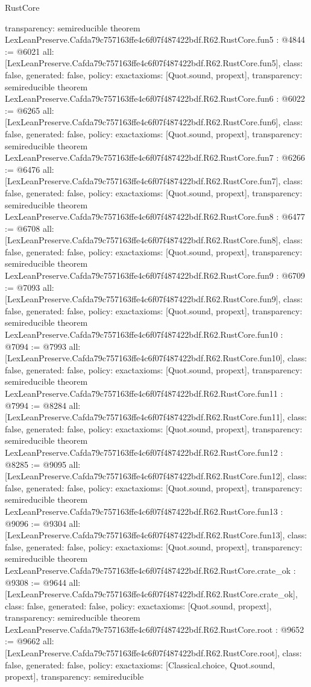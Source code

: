 \begin{lexlean}{RustCore}
\begin{coremodule}
{  transparency: semireducible
}
theorem LexLeanPreserve.Cafda79c757163ffe4c6f07f487422bdf.R62.RustCore.fun5 : @4844 := @6021 {
  all: [LexLeanPreserve.Cafda79c757163ffe4c6f07f487422bdf.R62.RustCore.fun5],
  class: false,
  generated: false,
  policy: exact{axioms: [Quot.sound, propext]},
  transparency: semireducible
}
theorem LexLeanPreserve.Cafda79c757163ffe4c6f07f487422bdf.R62.RustCore.fun6 : @6022 := @6265 {
  all: [LexLeanPreserve.Cafda79c757163ffe4c6f07f487422bdf.R62.RustCore.fun6],
  class: false,
  generated: false,
  policy: exact{axioms: [Quot.sound, propext]},
  transparency: semireducible
}
theorem LexLeanPreserve.Cafda79c757163ffe4c6f07f487422bdf.R62.RustCore.fun7 : @6266 := @6476 {
  all: [LexLeanPreserve.Cafda79c757163ffe4c6f07f487422bdf.R62.RustCore.fun7],
  class: false,
  generated: false,
  policy: exact{axioms: [Quot.sound, propext]},
  transparency: semireducible
}
theorem LexLeanPreserve.Cafda79c757163ffe4c6f07f487422bdf.R62.RustCore.fun8 : @6477 := @6708 {
  all: [LexLeanPreserve.Cafda79c757163ffe4c6f07f487422bdf.R62.RustCore.fun8],
  class: false,
  generated: false,
  policy: exact{axioms: [Quot.sound, propext]},
  transparency: semireducible
}
theorem LexLeanPreserve.Cafda79c757163ffe4c6f07f487422bdf.R62.RustCore.fun9 : @6709 := @7093 {
  all: [LexLeanPreserve.Cafda79c757163ffe4c6f07f487422bdf.R62.RustCore.fun9],
  class: false,
  generated: false,
  policy: exact{axioms: [Quot.sound, propext]},
  transparency: semireducible
}
theorem LexLeanPreserve.Cafda79c757163ffe4c6f07f487422bdf.R62.RustCore.fun10 : @7094 := @7993 {
  all: [LexLeanPreserve.Cafda79c757163ffe4c6f07f487422bdf.R62.RustCore.fun10],
  class: false,
  generated: false,
  policy: exact{axioms: [Quot.sound, propext]},
  transparency: semireducible
}
theorem LexLeanPreserve.Cafda79c757163ffe4c6f07f487422bdf.R62.RustCore.fun11 : @7994 := @8284 {
  all: [LexLeanPreserve.Cafda79c757163ffe4c6f07f487422bdf.R62.RustCore.fun11],
  class: false,
  generated: false,
  policy: exact{axioms: [Quot.sound, propext]},
  transparency: semireducible
}
theorem LexLeanPreserve.Cafda79c757163ffe4c6f07f487422bdf.R62.RustCore.fun12 : @8285 := @9095 {
  all: [LexLeanPreserve.Cafda79c757163ffe4c6f07f487422bdf.R62.RustCore.fun12],
  class: false,
  generated: false,
  policy: exact{axioms: [Quot.sound, propext]},
  transparency: semireducible
}
theorem LexLeanPreserve.Cafda79c757163ffe4c6f07f487422bdf.R62.RustCore.fun13 : @9096 := @9304 {
  all: [LexLeanPreserve.Cafda79c757163ffe4c6f07f487422bdf.R62.RustCore.fun13],
  class: false,
  generated: false,
  policy: exact{axioms: [Quot.sound, propext]},
  transparency: semireducible
}
theorem LexLeanPreserve.Cafda79c757163ffe4c6f07f487422bdf.R62.RustCore.crate_ok : @9308 := @9644 {
  all: [LexLeanPreserve.Cafda79c757163ffe4c6f07f487422bdf.R62.RustCore.crate_ok],
  class: false,
  generated: false,
  policy: exact{axioms: [Quot.sound, propext]},
  transparency: semireducible
}
theorem LexLeanPreserve.Cafda79c757163ffe4c6f07f487422bdf.R62.RustCore.root : @9652 := @9662 {
  all: [LexLeanPreserve.Cafda79c757163ffe4c6f07f487422bdf.R62.RustCore.root],
  class: false,
  generated: false,
  policy: exact{axioms: [Classical.choice, Quot.sound, propext]},
  transparency: semireducible
}


\end{coremodule}
\end{lexlean}
